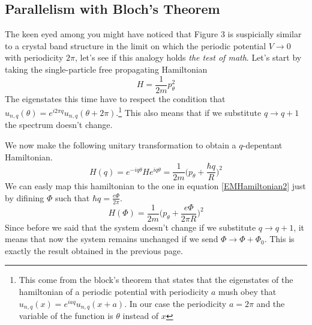     \subsection*{Parallelism with Bloch's Theorem}
    
        The keen eyed among you might have noticed that Figure 3 is suspicially similar to a crystal band structure in the limit on which the periodic potential $V\to 0$ with periodicity $2\pi$, let's see if this analogy holds \textit{the test of math}. Let's start by taking the single-particle free propagating Hamiltonian 
        \[
            H=\frac 1{2m}p_\theta^2
        \]
        The eigenstates this time have to respect the condition that $u_{n,q}(\theta)=e^{i2\pi q}u_{n,q}(\theta+2\pi)$.\footnote{This come from the block's theorem that states that the eigenstates of the hamiltonian of a periodic potential with periodicity $a$ mush obey that $u_{n,q}(x)=e^{iaq}u_{n,q}(x+a)$. In our case the periodicity $a=2\pi$ and the variable of the function is $\theta$ instead of $x$} This also means that if we substitute $q\to q+1$ the spectrum doesn't change. 

        We now make the following unitary transformation to obtain a $q$-depentant Hamiltonian.
        \[
            H(q)=e^{-iq\theta}He^{iq\theta}=\frac 1{2m}\bigg (p_\theta + \frac {\hbar q}R \bigg)^2
        \]
        We can easly map this hamiltonian to the one in equation \ref{EMHamiltonian2} just by difining $\Phi$ such that $\hbar q= \frac {e\Phi}{2\pi}$. 
        \begin{equation} \label{blochA}
            H(\Phi)=\frac 1{2m}\bigg(p_\theta + \frac{e\Phi}{2\pi R}\bigg)^2
        \end{equation}
        Since before we said that the system doesn't change if we substitute $q\to q+1$, it means that now the system remains unchanged if we send $\Phi \to \Phi+\Phi_0$. This is exactly the result obtained in the previous page.
    
